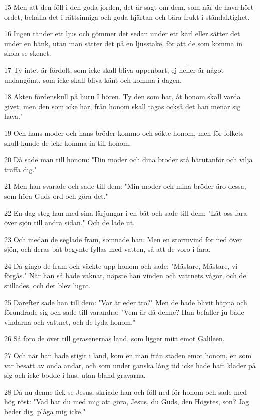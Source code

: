 \par 15 Men att den föll i den goda jorden, det är sagt om dem, som när de hava hört ordet, behålla det i rättsinniga och goda hjärtan och bära frukt i ståndaktighet.
\par 16 Ingen tänder ett ljus och gömmer det sedan under ett kärl eller sätter det under en bänk, utan man sätter det på en ljusstake, för att de som komma in skola se skenet.
\par 17 Ty intet är fördolt, som icke skall bliva uppenbart, ej heller är något undangömt, som icke skall bliva känt och komma i dagen.
\par 18 Akten fördenskull på huru I hören. Ty den som har, åt honom skall varda givet; men den som icke har, från honom skall tagas också det han menar sig hava."
\par 19 Och hans moder och hans bröder kommo och sökte honom, men för folkets skull kunde de icke komma in till honom.
\par 20 Då sade man till honom: "Din moder och dina broder stå härutanför och vilja träffa dig."
\par 21 Men han svarade och sade till dem: "Min moder och mina bröder äro dessa, som höra Guds ord och göra det."
\par 22 En dag steg han med sina lärjungar i en båt och sade till dem: "Låt oss fara över sjön till andra sidan." Och de lade ut.
\par 23 Och medan de seglade fram, somnade han. Men en stormvind for ned över sjön, och deras båt begynte fyllas med vatten, så att de voro i fara.
\par 24 Då gingo de fram och väckte upp honom och sade: "Mästare, Mästare, vi förgås." När han så hade vaknat, näpste han vinden och vattnets vågor, och de stillades, och det blev lugnt.
\par 25 Därefter sade han till dem: "Var är eder tro?" Men de hade blivit häpna och förundrade sig och sade till varandra: "Vem är då denne? Han befaller ju både vindarna och vattnet, och de lyda honom."
\par 26 Så foro de över till gerasenernas land, som ligger mitt emot Galileen.
\par 27 Och när han hade stigit i land, kom en man från staden emot honom, en som var besatt av onda andar, och som under ganska lång tid icke hade haft kläder på sig och icke bodde i hus, utan bland gravarna.
\par 28 Då nu denne fick se Jesus, skriade han och föll ned för honom och sade med hög röst: "Vad har du med mig att göra, Jesus, du Guds, den Högstes, son? Jag beder dig, plåga mig icke."
